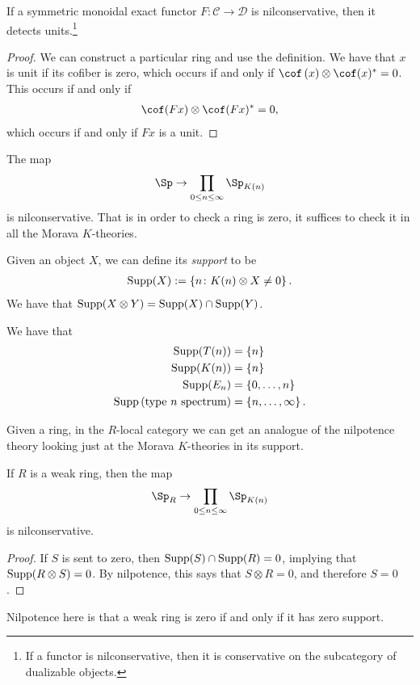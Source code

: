 \begin{lemma} If a symmetric monoidal exact functor $F: \mathscr{C} \to \mathscr{D}$ is nilconservative, then it detects units.\footnote{If a functor is nilconservative, then it is conservative on the subcategory of dualizable objects.}
\end{lemma}
\begin{proof} We can construct a particular ring and use the definition. We have that $x$ is unit if its cofiber is zero, which occurs if and only if $\cof \left( x \right) \otimes \cof(x)^\ast= 0$. This occurs if and only if
\begin{align*}
    \cof(Fx) \otimes \cof(Fx)^\ast = 0,
\end{align*}
which occurs if and only if $Fx$ is a unit.
\end{proof}

\begin{theorem} The map
\begin{align*}
    \Sp \to \prod_{0\le n\le \infty} \Sp_{K(n)}
\end{align*}
is nilconservative. That is in order to check a ring is zero, it suffices to check it in all the Morava $K$-theories.
\end{theorem}

Given an object $X$, we can define its \textit{support} to be
\begin{align*}
    \text{Supp}(X) := \left\{ n \colon K(n) \otimes X \ne 0 \right\}.
\end{align*}
We have that $\text{Supp}(X \otimes Y) = \text{Supp}(X) \cap \text{Supp}(Y)$.

\begin{example} We have that
\begin{align*}
    \text{Supp}(T(n)) &= \left\{ n \right\} \\
    \text{Supp}(K(n)) &= \left\{ n \right\} \\
    \text{Supp}(E_n) &= \left\{ 0, \ldots, n \right\} \\
    \text{Supp} \left( \text{type } n \text{ spectrum} \right) &= \left\{ n, \ldots, \infty \right\}.
\end{align*}
\end{example}



Given a ring, in the $R$-local category we can get an analogue of the nilpotence theory looking just at the Morava $K$-theories in its support.
\begin{proposition} If $R$ is a weak ring, then the map
\begin{align*}
    \Sp_R \to \prod_{0\le n \le \infty} \Sp_{K(n)}
\end{align*}
is nilconservative.
\end{proposition}
\begin{proof} If $S$ is sent to zero, then $\text{Supp}(S) \cap \text{Supp}(R) = 0$, implying that $\text{Supp}(R \otimes S) = 0$. By nilpotence, this says that $S \otimes R = 0$, and therefore $S=0$.
\end{proof}
Nilpotence here is that a weak ring is zero if and only if it has zero support.

